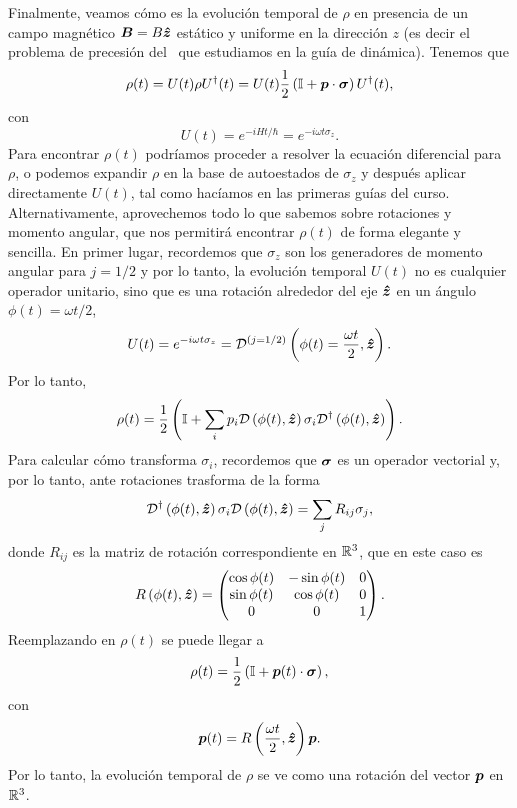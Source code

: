 \documentclass[10pt, a4paper]{article}
\numberwithin{equation}{subsection}
\begin{document}
Finalmente, veamos cómo es la evolución temporal de $\rho$ en presencia de un
campo magnético $\vb*{B} = B\vu*{z}$ estático y uniforme en la dirección $z$
(es decir el problema de precesión del \spin~que estudiamos en la guía de
dinámica). Tenemos que
\begin{equation}
  \rho(t) = U(t)\rho U^\dagger(t) = U(t)\frac{1}{2}\left(\mathbb{I} +
  \vb*{p}\cdot\vb*{\sigma}\right)U^\dagger(t),
\end{equation}
con
\begin{equation}
  U(t) = e^{-iHt/\hbar} = e^{-i\omega t\sigma_z}.
\end{equation}
Para encontrar $\rho(t)$ podríamos proceder a resolver la ecuación diferencial
para $\rho$, o podemos expandir $\rho$ en la base de autoestados de $\sigma_z$
y después aplicar directamente $U(t)$, tal como hacíamos en las primeras guías
del curso. Alternativamente, aprovechemos todo lo que sabemos sobre rotaciones
y momento angular, que nos permitirá encontrar $\rho(t)$ de forma elegante y
sencilla. En primer lugar, recordemos que $\sigma_z$ son los generadores de
momento angular para $j = 1/2$ y por lo tanto, la evolución temporal $U(t)$ no
es cualquier operador unitario, sino que es una rotación alrededor del eje
$\vu*{z}$ en un ángulo $\phi(t) = \omega t /2$,
\begin{equation}
  U(t) = e^{-i\omega t\sigma_z} = \RotationOp^{(j=1/2)}\left(\phi(t) =
  \frac{\omega t}{2}, \vers{z}\right).
\end{equation}
Por lo tanto,
\begin{equation}
  \rho(t) = \frac{1}{2}\left(\Id + \sum_ip_i 
  \RotationOp\left(\phi(t), \vers{z}\right)\sigma_i
  {\RotationOp}^\dagger\left(\phi(t), \vers{z}\right)\right).
\end{equation}
Para calcular cómo transforma $\sigma_i$, recordemos que $\vb*{\sigma}$ es un
operador vectorial y, por lo tanto, ante rotaciones trasforma de la forma
\begin{equation}
  {\RotationOp}^\dagger\left(\phi(t), \vers{z}\right)\sigma_i
  {\RotationOp}\left(\phi(t), \vers{z}\right) = \sum_j R_{ij} \sigma_j,
\end{equation}
donde $R_{ij}$ es la matriz de rotación correspondiente en $\mathbb{R}^3$, que en
este caso es
\begin{equation}
  R\left(\phi(t), \vu*{z}\right) = \begin{pmatrix} \cos\phi(t) & -\sin\phi(t)
    & 0 \\ \sin\phi(t) & \cos\phi(t) & 0 \\
    0 & 0 & 1 \end{pmatrix}.
\end{equation}
Reemplazando en $\rho(t)$ se puede llegar a
\begin{equation}
  \rho(t) = \frac{1}{2}\left(\mathbb{I} + \vb*{p}(t)\cdot\vb*{\sigma}\right),
\end{equation}
con
\begin{equation}
  \vb*{p}(t) = R\left(\frac{\omega t}{2}, \vu*{z}\right)\vb*{p}.
\end{equation}
Por lo tanto, la evolución temporal de $\rho$ se ve como una rotación del
vector $\vb*{p}$ en $\mathbb{R}^3$.
\end{document}
